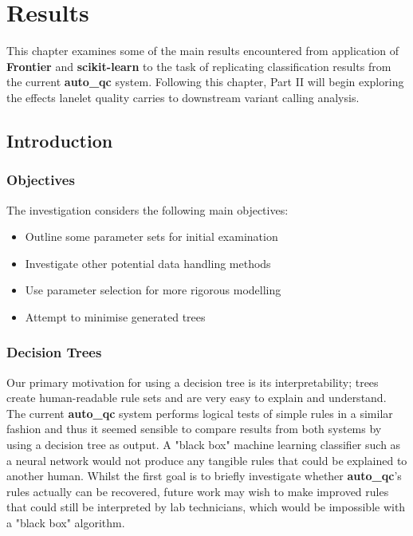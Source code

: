 \chapter{Results}
\ifpdf
    \graphicspath{{Chapter4/Figs/Raster/}{Chapter4/Figs/PDF/}{Chapter4/Figs/}}
\else
    \graphicspath{{Chapter4/Figs/Vector/}{Chapter4/Figs/}}
\fi

This chapter examines some of the main results encountered from application of
\textbf{Frontier} and \textbf{scikit-learn} to the task of replicating
classification results from the current \textbf{auto\_qc} system.
Following this chapter, Part II will begin exploring the effects lanelet quality
carries to downstream variant calling analysis.

\section{Introduction}
\subsection{Objectives}

The investigation considers the following main objectives:

\begin{itemize}
    \item Outline some parameter sets for initial examination
    \item Investigate other potential data handling methods
    \item Use parameter selection for more rigorous modelling
    \item Attempt to minimise generated trees
\end{itemize}

\subsection{Decision Trees}

Our primary motivation for using a decision tree is its interpretability; trees
create human-readable rule sets and are very easy to explain and understand. The
current \textbf{auto\_qc} system performs logical tests of simple rules in a
similar fashion and thus it seemed sensible to compare results from both systems
by using a decision tree as output. A "black box" machine learning
classifier such as a neural network would not produce any tangible rules that
could be explained to another human. Whilst the first goal is to briefly
investigate whether \textbf{auto\_qc}'s rules actually can be recovered, future work may
wish to make improved rules that could still be interpreted by lab technicians,
which would be impossible with a "black box" algorithm.

